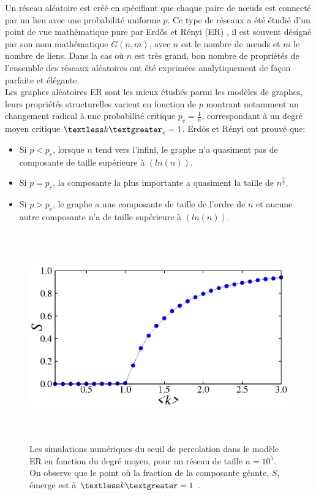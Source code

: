  Un réseau aléatoire est créé en spécifiant que chaque paire de nœuds est connecté par un lien avec une probabilité uniforme $p$. Ce type de réseaux a été étudié d'un point de vue mathématique pure par Erd\H{o}s et Rényi (ER) \cite{Erdos-Renyi1959,Erdos-Renyi1960,Erdos-Renyi1961}, il est souvent désigné par son nom mathématique $G(n,m)$, avec $n$ est le nombre de nœuds et $m$ le nombre de liens. 
 Dans la cas où $n$ est très grand, bon nombre de propriétés de l'ensemble des réseaux aléatoires ont été exprimées analytiquement de façon parfaite et élégante.\\
 Les graphes aléatoires ER sont les mieux étudiés parmi les modèles de graphes, leurs propriétés structurelles varient en fonction de $p$ montrant notamment un changement radical à une probabilité critique $p_c=\frac{1}{n}$,
 correspondant à un degré moyen critique $\textless k \textgreater_c=1$. Erdös et Rényi ont prouvé que:\\
 \begin{itemize}
  \item Si $p <p_c$, lorsque $n$ tend vers l'infini, le graphe n'a quasiment pas de composante de taille  
  supérieure à $(ln(n))$.
  \item Si $p=p_c$, la composante la plus importante a quasiment la taille de $n^{\frac{2}{3}}$.
  \item Si $p> p_c$, le graphe a une composante de taille de l'ordre de $n$ et aucune autre composante n'a de taille supérieure à $(ln(n))$.
 \end{itemize}
\begin{figure}[h!]
	\centering
	\includegraphics[width=12cm,height=9cm]{./figures/fig-ER-CG}
	\caption{Les simulations numériques du seuil de percolation dans le modèle ER en fonction du degré moyen, pour un réseau de taille $n=10^5$. On observe que le point où la fraction de la composante géante, $S$, émerge est à $\textless k\textgreater=1$ .}
	
	\label{percolation-graph}
\end{figure}

